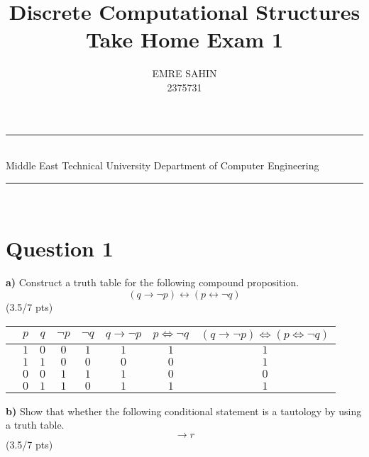 \documentclass[a4paper,12pt]{article}
\title{Discrete Computational Structures \\ Take Home Exam 1}
\author{EMRE SAHIN \\ 2375731} %
\date{} %
\newcommand{\HRule}{\rule{\linewidth}{1mm}}
\newcommand\tab[1][1cm]{\hspace*{#1}}
\begin{document}
\HRule\\
Middle East Technical University \hfill Department of Computer Engineering
{\let\newpage\relax\maketitle}
\HRule\\
\vspace{1cm}


\section*{Question 1 \hfill {}}

\tab \textbf{a)} Construct a truth table for the following compound proposition.
\begin{equation*}
    (q \rightarrow \neg p)\leftrightarrow (p \leftrightarrow \neg q)
\end{equation*} 
\hfill \small{(3.5/7 pts)} \\
\begin{tcolorbox}
\begin{table}[H]
    \centering
    \begin{tabular}{|c||c|c|c|c|c|c|c|}
\hline
&$p$ &$q$ &$\neg p$ &$\neg q$ &$q\rightarrow  \neg p$ &$p \iff \neg q $  &$(q \rightarrow   \neg p) \iff (p \iff \neg q ) $ \\ \hline
&$1$&$0$ &$0$ &$1$  &$1$ &$1$  &$1$ \\ \hline
&$1$&$1$ &$0$ &$0$  &$0$ &$0$  &$1$ \\ \hline
&$0$&$0$ &$1$ &$1$  &$1$ &$0$  &$0$ \\ \hline
&$0$&$1$ &$1$ &$0$  &$1$ &$1$  &$1$ \\ \hline
    \end{tabular}
    \label{tab:my_labelQ1_p1}
\end{table}

\end{tcolorbox}

\tab \textbf{b)} Show that whether the following conditional statement is a tautology by using a truth table.
\begin{equation*}
    [(p \vee q) \wedge (r \rightarrow p) \wedge (r \rightarrow q)] \rightarrow r
\end{equation*}
\hfill \small{(3.5/7 pts)}\\
\end{document}
